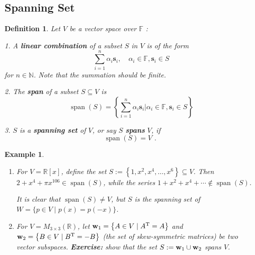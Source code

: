 \documentclass[11pt]{article}
\newtheorem{definition}[theorem]{Definition}
\newtheorem{example}[theorem]{Example}
\begin{document}
\subsection{Spanning Set}

\begin{definition} Let \(V\) be a vector space over \(\mathbb{F}\) :

1. A {\bf linear combination} of a subset \(S\) in \(V\) is of the form
\[
\mathop{\sum }\limits_{{i = 1}}^n\alpha_{i}{\mathbf{s}}_{i},\quad \alpha_{i} \in  \mathbb{F},{\mathbf{s}}_{i} \in  S
\]
for $n \in \mathbb{N}$. Note that the summation should be finite.

2. The {\bf span} of a subset \(S \subseteq  V\) is
\[
\operatorname{span}\left( S\right)  = \left\{  {\mathop{\sum }\limits_{{i = 1}}^n\alpha_{i}{\mathbf{s}}_{i} \Big|  \alpha_{i} \in  \mathbb{F},{\mathbf{s}}_{i} \in  S}\right\}
\]

3. \(S\) is a {\bf spanning set} of \(V\), or say \(S\) {\bf spans} \(V\), if
\[
\operatorname{span}\left( S\right)  = V\text{ . }
\]
\end{definition}

\begin{example} 

\begin{enumerate}
    \item For \(V = \mathbb{R}\left\lbrack  x\right\rbrack\), define the set \(S := \left\{  {1,{x}^2,{x}^{4},\ldots ,{x}^{6}}\right\} \subseteq V\). Then \(2 + {x}^{4} + \pi {x}^{106} \in  \operatorname{span}\left( S\right)\), while the series \(1 + {x}^2 + {x}^{4} + \cdots  \notin  \operatorname{span}\left( S\right)\). 

It is clear that \(\operatorname{span}\left( S\right)  \neq  V\), but \(S\) is the spanning set of \(W = \{ p \in  V \mid  p\left( x\right)  = p\left( {-x}\right) \}\).

\item For \(V = {M}_{3 \times  3}\left( \mathbb{R}\right)\), let \({\bf w}_1 = \left\{  {A \in  V \mid  {A}^{\mathrm{T}} = A}\right\}\) and \({\bf w}_2 = \left\{  {B \in  V \mid  {B}^{\mathrm{T}} =  - B}\right\}\) (the set of skew-symmetric matrices) be two vector subspaces. {\bf Exercise:} show that the set \( S := {\bf w}_1\cup {\bf w}_2\) spans \(V\).
\end{enumerate}
\end{example}
\end{document}
